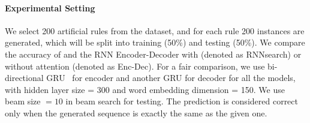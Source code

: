 \paragraph{Experimental Setting} We select 200 artificial rules from the dataset, and for each rule 200 instances are generated, which will be split into training (50\%) and testing (50\%).  We compare the  accuracy of \copynet and the RNN Encoder-Decoder with (denoted as RNNsearch) or without attention (denoted as Enc-Dec).
For a fair comparison, we use bi-directional GRU~\cite{cho2014learning} for encoder and another GRU for decoder  for all the models, with hidden layer size = 300 and word embedding dimension = 150. We use beam size  $=10$ in beam search for testing. The prediction is considered correct only when the generated sequence is exactly the same as the given one. 


